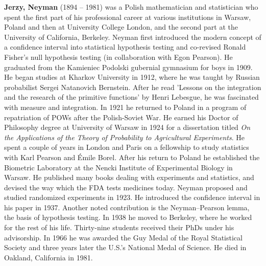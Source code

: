 \textbf{Jerzy, Neyman} (1894 – 1981) was a Polish mathematician and statistician who spent the first part of his professional career at various institutions in Warsaw, Poland and then at University College London, and the second part at the University of California, Berkeley. Neyman first introduced the modern concept of a confidence interval into statistical hypothesis testing and co-revised Ronald Fisher's null hypothesis testing (in collaboration with Egon Pearson).  He graduated from the Kamieniec Podolski gubernial gymnasium for boys in 1909. He began studies at Kharkov University in 1912, where he was taught by Russian probabilist Sergei Natanovich Bernstein. After he read 'Lessons on the integration and the research of the primitive functions' by Henri Lebesgue, he was fascinated with measure and integration. In 1921 he returned to Poland in a program of repatriation of POWs after the Polish-Soviet War. He earned his Doctor of Philosophy degree at University of Warsaw in 1924 for a dissertation titled \textit{On the Applications of the Theory of Probability to Agricultural Experiments}. He spent a couple of years in London and Paris on a fellowship to study statistics with Karl Pearson and Émile Borel. After his return to Poland he established the Biometric Laboratory at the Nencki Institute of Experimental Biology in Warsaw. He published many books dealing with experiments and statistics, and devised the way which the FDA tests medicines today. Neyman proposed and studied randomized experiments in 1923. He introduced the confidence interval in his paper in 1937. Another noted contribution is the Neyman–Pearson lemma, the basis of hypothesis testing. In 1938 he moved to Berkeley, where he worked for the rest of his life. Thirty-nine students received their PhDs under his advisorship. In 1966 he was awarded the Guy Medal of the Royal Statistical Society and three years later the U.S.'s National Medal of Science. He died in Oakland, California in 1981.

